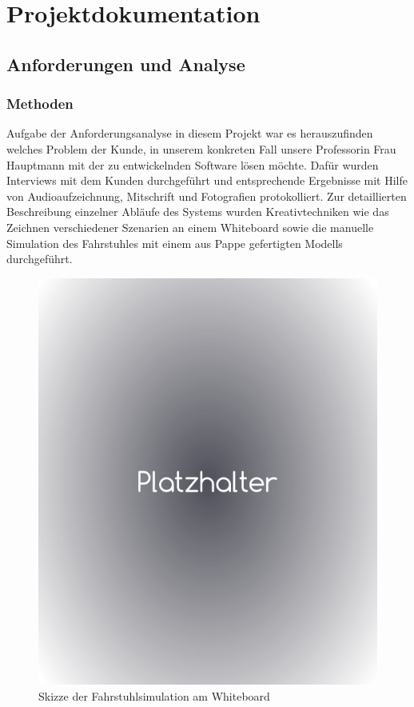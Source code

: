 \part{Projektdokumentation}
\chapter{Anforderungen und Analyse}
\section{Methoden}
Aufgabe der Anforderungsanalyse in diesem Projekt war es herauszufinden
welches Problem der Kunde, in unserem konkreten Fall unsere Professorin Frau 
Hauptmann mit der zu entwickelnden Software lösen möchte. Dafür wurden 
Interviews mit dem Kunden durchgeführt und entsprechende Ergebnisse mit Hilfe 
von Audioaufzeichnung, Mitschrift und Fotografien protokolliert. Zur 
detaillierten Beschreibung einzelner Abläufe des Systems wurden 
Kreativtechniken wie das Zeichnen verschiedener Szenarien an einem Whiteboard 
sowie die manuelle Simulation des Fahrstuhles mit einem aus Pappe gefertigten Modells durchgeführt.
\begin{figure}[hbt]
	\includegraphics[width=\textwidth /2]{images/platzhalter.png}
	\caption{Skizze der Fahrstuhlsimulation am Whiteboard}
	\label{fig:Whiteboard}
\end{figure}
